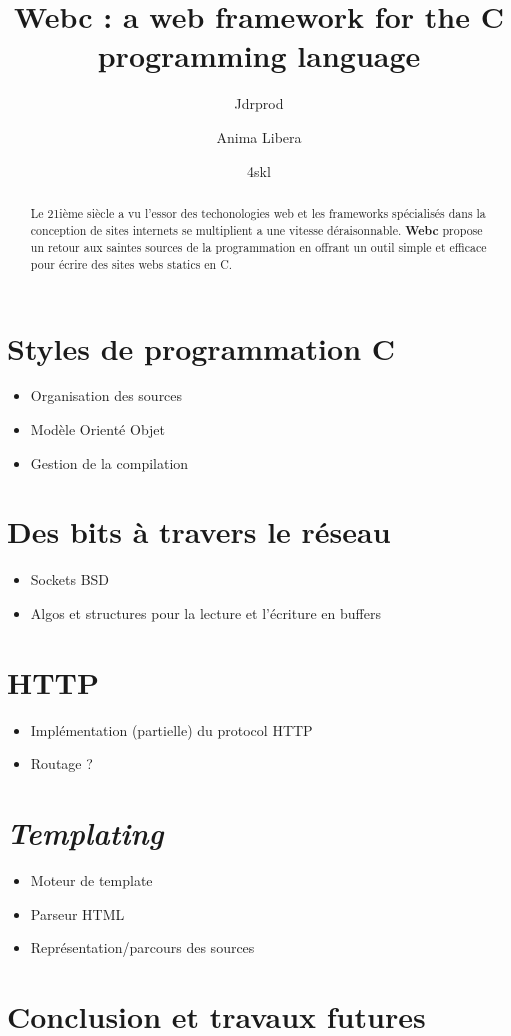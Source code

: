 \documentclass[french, twocolumn]{article}
\begin{document}
    \title{Webc : a web framework for the C programming language}
    \author{Jdrprod \and Anima Libera \and 4skl}
    \maketitle
    \begin{abstract}
        Le 21ième siècle a vu l'essor des techonologies web et les frameworks spécialisés dans la conception de sites internets se multiplient a une vitesse déraisonnable. \textbf{Webc} propose un retour aux saintes sources de la programmation en offrant un outil simple et efficace pour écrire des sites webs statics en C.
    \end{abstract}
    \section{Styles de programmation C}
    \begin{itemize}
        \item Organisation des sources
        \item Modèle Orienté Objet
        \item Gestion de la compilation
    \end{itemize}
    \section{Des bits à travers le réseau}
    \begin{itemize}
        \item Sockets BSD
        \item Algos et structures pour la lecture et l'écriture en buffers
    \end{itemize}
    \section{HTTP}
    \begin{itemize}
        \item Implémentation (partielle) du protocol HTTP
        \item Routage ?
    \end{itemize}
    \section{\textit{Templating}}
    \begin{itemize}
        \item Moteur de template
        \item Parseur HTML
        \item Représentation/parcours des sources
    \end{itemize}
    \section{Conclusion et travaux futures}
\end{document}
